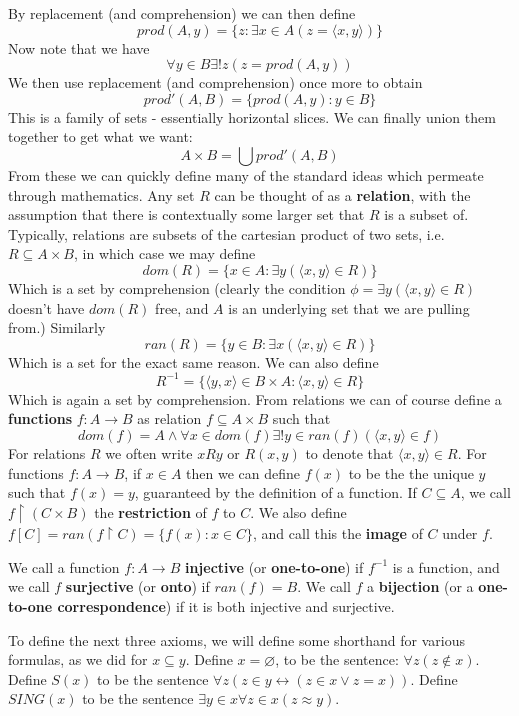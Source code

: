 \documentclass{article}
\theoremstyle{definition}
\theoremstyle{plain}
\theoremstyle{theorem}
\begin{document}
By replacement (and comprehension) we can then define
\[ prod(A,y) = \{z: \exists x\in A (z = \langle x,y \rangle) \} \]
Now note that we have
\[ \forall y \in B \exists! z (z = prod(A,y)) \]
We then use replacement (and comprehension) once more to obtain
\[ prod'(A,B) = \{prod(A,y): y \in B\} \]
This is a family of sets - essentially horizontal slices. We can finally union them together to get what we want:
\[ A \times B = \bigcup prod'(A,B) \]
From these we can quickly define many of the standard ideas which permeate through mathematics. Any set $R$ can be thought of as a \textbf{relation}, with the assumption that there is contextually some larger set that $R$ is a subset of. Typically, relations are subsets of the cartesian product of two sets, i.e. $R \subseteq A \times B$, in which case we may define 
\[ dom(R) = \{ x \in A: \exists y (\langle x,y \rangle \in R) \} \]
Which is a set by comprehension (clearly the condition $\phi = \exists y (\langle x,y \rangle \in R)$ doesn't have $dom(R)$ free, and $A$ is an underlying set that we are pulling from.) Similarly 
\[ ran(R) = \{y \in B: \exists x (\langle x,y \rangle \in R) \} \]
Which is a set for the exact same reason. We can also define 
\[ R^{-1} = \{\langle y,x \rangle \in B \times A: \langle x,y \rangle \in R\} \]
Which is again a set by comprehension. From relations we can of course define a \textbf{functions} $f:A \to B$ as relation $f \subseteq A \times B$ such that 
\[ dom(f) = A \wedge \forall x \in dom(f) \exists! y \in ran(f)(\langle x,y \rangle \in f) \]
For relations $R$ we often write $xRy$ or $R(x,y)$ to denote that $\langle x,y \rangle \in R$. For functions $f: A \to B$, if $x \in A$ then we can define $f(x)$ to be the the unique $y$ such that $f(x) = y$, guaranteed by the definition of a function. If $C \subseteq A$, we call $f \restriction (C \times B)$ the \textbf{restriction} of $f$ to $C$. We also define $f[C] = ran(f \restriction C) = \{f(x): x \in C\}$, and call this the \textbf{image} of $C$ under $f$. \par 
We call a function $f:A \to B$ \textbf{injective} (or \textbf{one-to-one}) if $f^{-1}$ is a function, and we call $f$ \textbf{surjective} (or \textbf{onto}) if $ran(f) = B$. We call $f$ a \textbf{bijection} (or a \textbf{one-to-one correspondence}) if it is both injective and surjective. \par 
To define the next three axioms, we will define some shorthand for various formulas, as we did for $x \subseteq y$. Define $x=\varnothing$, to be the sentence: $\forall z(z \notin x)$. Define $S(x)$ to be the sentence $\forall z(z \in y \leftrightarrow (z \in x \vee z = x))$. Define $SING(x)$ to be the sentence $\exists y \in x \forall z \in x (z \approx y)$. \par 
\end{document}
